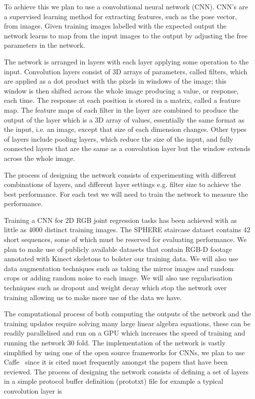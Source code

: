 \documentclass[11pt]{article} %
\begin{document}
To achieve this we plan to use a convolutional neural network (CNN). CNN's are a supervised learning method for extracting features, such as the pose vector, from images. Given training images labelled with the expected output the network learns to map from the input images to the output by adjusting the free parameters in the network. 

The network is arranged in layers with each layer applying some operation to the input. Convolution layers consist of 3D arrays of parameters, called filters, which are applied as a dot product with the pixels in windows of the image; this window is then shifted across the whole image producing a value, or response, each time. The response at each position is stored in a matrix, called a feature map. The feature maps of each filter in the layer are combined to produce the output of the layer which is a 3D array of values, essentially the same format as the input, i.e. an image, except that size of each dimension changes. Other types of layers include pooling layers, which reduce the size of the input, and fully connected layers that are the same as a convolution layer but the window extends across the whole image. 

The process of designing the network consists of experimenting with different combinations of layers, and different layer settings e.g. filter size to achieve the best performance. For each test we will need to train the network to measure the performance. 

Training a CNN for 2D RGB joint regression tasks has been achieved with as little as 4000 distinct training images\cite{Jain2014}. The SPHERE staircase dataset contains 42 short sequences, some of which must be reserved for evaluating performance. We plan to make use of publicly available datasets that contain RGB-D footage annotated with Kinect skeletons to bolster our training data. We will also use data augmentation techniques such as taking the mirror images and random crops or adding random noise to each image. We will also use regularisation techniques such as dropout and weight decay which stop the network over training allowing us to make more use of the data we have.

The computational process of both computing the outputs of the network and the training updates require solving many large linear algebra equations, these can be readily parallelised and run on a GPU which increases the speed of training and running the network 30 fold. The implementation of the network is vastly simplified by using one of the open source frameworks for CNNs, we plan to use Caffe~\cite{Jia2014} since it is cited most frequently amongst the papers that have been reviewed. The process of designing the network consists of defining a set of layers in a simple protocol buffer definition (prototxt) file for example a typical convolution layer is 	
\end{document}
